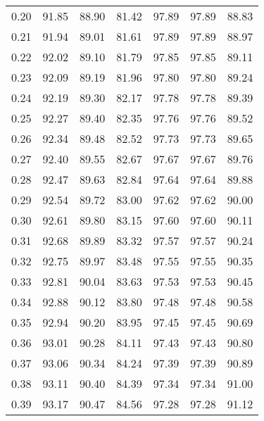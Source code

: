 \begin{tabular}{|c|c|c|c|c|c|c|}
      0.20 &     91.85 &     88.90 &      81.42 &   97.89 &      97.89 &         88.83 \\
      0.21 &     91.94 &     89.01 &      81.61 &   97.89 &      97.89 &         88.97 \\
      0.22 &     92.02 &     89.10 &      81.79 &   97.85 &      97.85 &         89.11 \\
      0.23 &     92.09 &     89.19 &      81.96 &   97.80 &      97.80 &         89.24 \\
      0.24 &     92.19 &     89.30 &      82.17 &   97.78 &      97.78 &         89.39 \\
      0.25 &     92.27 &     89.40 &      82.35 &   97.76 &      97.76 &         89.52 \\
      0.26 &     92.34 &     89.48 &      82.52 &   97.73 &      97.73 &         89.65 \\
      0.27 &     92.40 &     89.55 &      82.67 &   97.67 &      97.67 &         89.76 \\
      0.28 &     92.47 &     89.63 &      82.84 &   97.64 &      97.64 &         89.88 \\
      0.29 &     92.54 &     89.72 &      83.00 &   97.62 &      97.62 &         90.00 \\
      0.30 &     92.61 &     89.80 &      83.15 &   97.60 &      97.60 &         90.11 \\
      0.31 &     92.68 &     89.89 &      83.32 &   97.57 &      97.57 &         90.24 \\
      0.32 &     92.75 &     89.97 &      83.48 &   97.55 &      97.55 &         90.35 \\
      0.33 &     92.81 &     90.04 &      83.63 &   97.53 &      97.53 &         90.45 \\
      0.34 &     92.88 &     90.12 &      83.80 &   97.48 &      97.48 &         90.58 \\
      0.35 &     92.94 &     90.20 &      83.95 &   97.45 &      97.45 &         90.69 \\
      0.36 &     93.01 &     90.28 &      84.11 &   97.43 &      97.43 &         90.80 \\
      0.37 &     93.06 &     90.34 &      84.24 &   97.39 &      97.39 &         90.89 \\
      0.38 &     93.11 &     90.40 &      84.39 &   97.34 &      97.34 &         91.00 \\
      0.39 &     93.17 &     90.47 &      84.56 &   97.28 &      97.28 &         91.12 \\

\end{tabular}
